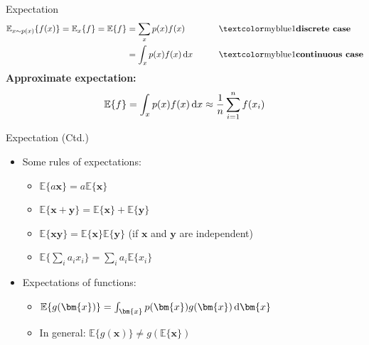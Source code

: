 \begin{frame}{Expectation}{}
	\begin{alignat}{2}
		\mathbb{E}_{x \sim p(x)}\{ f(x) \} = \mathbb{E}_x\{ f \} = \mathbb{E}\{ f \}
			&= \sum_x p(x) f(x)		&&\qquad\text{\highlight{discrete case}} \\
			&= \int_x p(x) f(x) \diff x	&&\qquad\text{\highlight{continuous case}}
	\end{alignat}
	\textbf{Approximate expectation:}
	\begin{equation}
		\mathbb{E}\{ f \} = \int_x p(x) f(x) \mathop{}\!\mathrm{d} x \approx \frac{1}{n} \sum_{i=1}^n f(x_i)
	\end{equation}
\end{frame}


\begin{frame}{Expectation (Ctd.)}{}
	\begin{itemize}
		\item Some rules of expectations:
		\begin{itemize}
			\item $\mathbb{E}\{ a \bm{x} \} = a \mathbb{E}\{ \bm{x} \}$
			\item $\mathbb{E}\{ \bm{x} + \bm{y} \} = \mathbb{E}\{ \bm{x} \} + \mathbb{E}\{ \bm{y} \}$
			\item $\mathbb{E}\{ \bm{x} \bm{y} \} = \mathbb{E}\{ \bm{x} \} \mathbb{E}\{ \bm{y} \}$ (if $\bm{x}$ and $\bm{y}$ are independent)
			\item $\mathbb{E}\{ \sum_i a_i x_i \} = \sum_i a_i \mathbb{E}\{ x_i \}$
		\end{itemize}
		\item Expectations of functions:
		\begin{itemize}
			\item $\mathbb{E}\{ g(\bm{x}) \} = \int_{\bm{x}} p(\bm{x}) g(\bm{x}) \diff \bm{x}$
			\item In general: $\mathbb{E}\{ g(\bm{x}) \} \ne g(\mathbb{E}\{ \bm{x} \})$
		\end{itemize}
	\end{itemize}
\end{frame}


